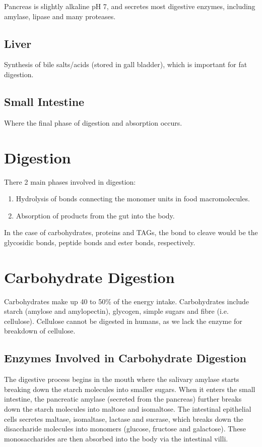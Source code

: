 \documentclass[a4paper, 12pt]{report}
\begin{document}
Pancreas is slightly alkaline pH 7, and secretes most digestive enzymes, including amylase, lipase and many proteases.

\subsection{Liver}

Synthesis of bile salts/acids (stored in gall bladder), which is important for fat digestion.

\subsection{Small Intestine}

Where the final phase of digestion and absorption occurs.

\section{Digestion}

There 2 main phases involved in digestion:
\begin{enumerate}
\item Hydrolysis of bonds connecting the monomer units in food macromolecules.
\item Absorption of products from the gut into the body.
\end{enumerate}

In the case of carbohydrates, proteins and TAGs, the bond to cleave would be the glycosidic bonds, peptide bonds and ester bonds, respectively.

\section{Carbohydrate Digestion}

Carbohydrates make up 40 to 50\% of the energy intake.
Carbohydrates include starch (amylose and amylopectin), glycogen, simple sugars and fibre (i.e. cellulose).
Cellulose cannot be digested in humans, as we lack the enzyme for breakdown of cellulose.

\subsection{Enzymes Involved in Carbohydrate Digestion}

The digestive process begins in the mouth where the salivary amylase starts breaking down the starch molecules into smaller sugars.
When it enters the small intestine, the pancreatic amylase (secreted from the pancreas) further breaks down the starch molecules into maltose and isomaltose.
The intestinal epithelial cells secretes maltase, isomaltase, lactase and sucrase, which breaks down the disaccharide molecules into monomers (glucose, fructose and galactose).
These monosaccharides are then absorbed into the body via the intestinal villi.
\end{document}
